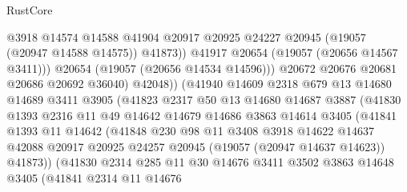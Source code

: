 \begin{lexlean}{RustCore}
\begin{coremodule}
                              @3918
                              @14574
                              @14588
                              @41904
                              @20917
                              @20925
                              @24227
                              @20945
                              (@19057 (@20947 @14588 @14575))
                              @41873))
                          @41917
                          @20654
                          (@19057 (@20656 @14567 @3411)))
                        @20654
                        (@19057 (@20656 @14534 @14596)))
                      @20672
                      @20676
                      @20681
                      @20686
                      @20692
                      @36040)
                    @42048))
                (@41940
                  @14609
                  @2318
                  @679
                  @13
                  @14680
                  @14689
                  @3411
                  @3905
                  (@41823
                    @2317
                    @50
                    @13
                    @14680
                    @14687
                    @3887
                    (@41830
                      @1393
                      @2316
                      @11
                      @49
                      @14642
                      @14679
                      @14686
                      @3863
                      @14614
                      @3405
                      (@41841
                        @1393
                        @11
                        @14642
                        (@41848
                          @230
                          @98
                          @11
                          @3408
                          @3918
                          @14622
                          @14637
                          @42088
                          @20917
                          @20925
                          @24257
                          @20945
                          (@19057 (@20947 @14637 @14623))
                          @41873))
                      (@41830
                        @2314
                        @285
                        @11
                        @30
                        @14676
                        @3411
                        @3502
                        @3863
                        @14648
                        @3405
                        (@41841
                          @2314
                          @11
                          @14676

\end{coremodule}
\end{lexlean}
